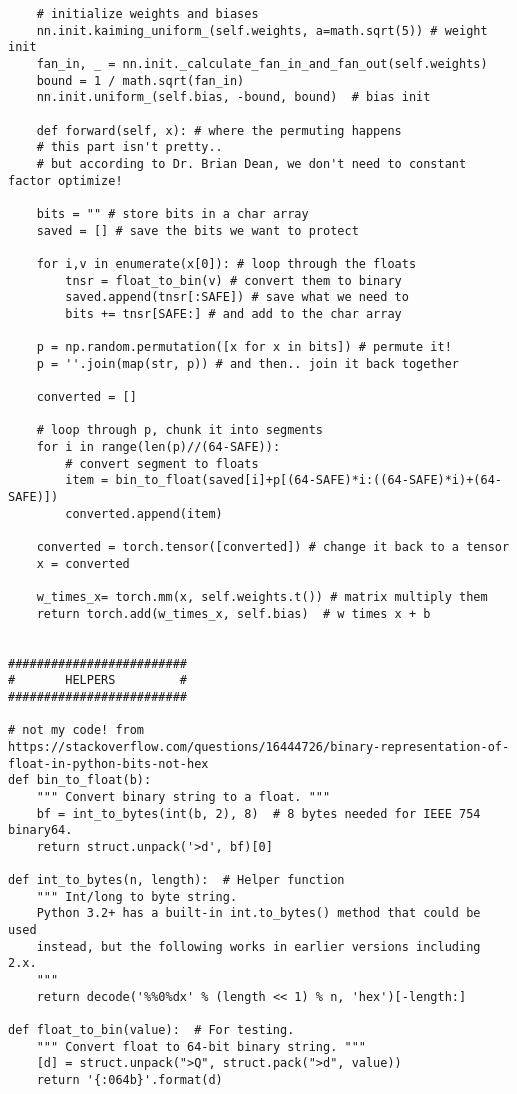 \documentclass[letterpaper]{article}
\begin{document}
\begin{verbatim}
	# initialize weights and biases
	nn.init.kaiming_uniform_(self.weights, a=math.sqrt(5)) # weight init
	fan_in, _ = nn.init._calculate_fan_in_and_fan_out(self.weights)
	bound = 1 / math.sqrt(fan_in)
	nn.init.uniform_(self.bias, -bound, bound)  # bias init

    def forward(self, x): # where the permuting happens
	# this part isn't pretty..
	# but according to Dr. Brian Dean, we don't need to constant factor optimize!

	bits = "" # store bits in a char array
	saved = [] # save the bits we want to protect

	for i,v in enumerate(x[0]): # loop through the floats
	    tnsr = float_to_bin(v) # convert them to binary
	    saved.append(tnsr[:SAFE]) # save what we need to
	    bits += tnsr[SAFE:] # and add to the char array

	p = np.random.permutation([x for x in bits]) # permute it!
	p = ''.join(map(str, p)) # and then.. join it back together

	converted = []

	# loop through p, chunk it into segments
	for i in range(len(p)//(64-SAFE)):
	    # convert segment to floats
	    item = bin_to_float(saved[i]+p[(64-SAFE)*i:((64-SAFE)*i)+(64-SAFE)])
	    converted.append(item)

	converted = torch.tensor([converted]) # change it back to a tensor
	x = converted

	w_times_x= torch.mm(x, self.weights.t()) # matrix multiply them
	return torch.add(w_times_x, self.bias)  # w times x + b


#########################
#       HELPERS         #
#########################

# not my code! from https://stackoverflow.com/questions/16444726/binary-representation-of-float-in-python-bits-not-hex
def bin_to_float(b):
    """ Convert binary string to a float. """
    bf = int_to_bytes(int(b, 2), 8)  # 8 bytes needed for IEEE 754 binary64.
    return struct.unpack('>d', bf)[0]

def int_to_bytes(n, length):  # Helper function
    """ Int/long to byte string.
	Python 3.2+ has a built-in int.to_bytes() method that could be used
	instead, but the following works in earlier versions including 2.x.
    """
    return decode('%%0%dx' % (length << 1) % n, 'hex')[-length:]

def float_to_bin(value):  # For testing.
    """ Convert float to 64-bit binary string. """
    [d] = struct.unpack(">Q", struct.pack(">d", value))
    return '{:064b}'.format(d)



\end{verbatim}
\end{document}
